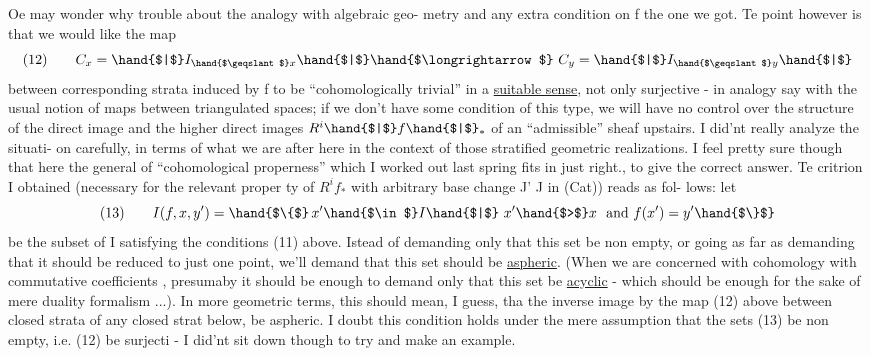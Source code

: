 Oe may wonder why trouble about the analogy with algebraic geo-%
metry and any extra condition on f  the one we got.  Te point
however is that we would like the map
\[ \text{(12)} \qquad C_x = \hand{$|$} I_{\hand{$\geqslant$}x} \hand{$|$} \hand{$\longrightarrow$} \ C_y = \hand{$|$} I_{\hand{$\geqslant$}y} \hand{$|$} \]
between corresponding strata induced by \hand{$|$}f\hand{$|$} to be ``cohomologically
trivial'' in a \uline{suitable sense},  not only surjective  -  in analogy say
with the usual notion of maps between triangulated spaces;  if we don't
have some condition of this type,  we will have no control over the
structure of the direct image and the higher direct images $R^i\hand{$|$}f\hand{$|$}_*$
of an ``admissible'' sheaf upstairs.  I did'nt really analyze the situati-%
on carefully,  in terms of what we are after here in the context of
those stratified geometric realizations.  I feel pretty sure though 
that here the general  of ``cohomological properness'' which I
worked out last spring fits in just right.,  to give the correct answer.
Te critrion I obtained (necessary for the relevant  proper%
ty of $R^if_*$  with arbitrary base change J' \hand{$\to$} J in (Cat)) reads as fol-%
lows:  let
\[ \text{(13)} \qquad I(f,x,y') = \hand{$\{$}\, x'\hand{$\in$} I \hand{$|$} \ x' \hand{$>$} x \ \text{ and } f(x') = y' \hand{$\}$} \]
be the subset of I satisfying the conditions (11) above.  Istead
of demanding only that this set be non empty,  or going as far as
demanding that it should  be reduced to just one point,  we'll
demand that this set should be \uline{aspheric}.  (When we are concerned with
cohomology with commutative coefficients ,  presumaby it should
be enough to demand only that this set be \uline{acyclic} - which should be
enough for the sake of mere duality formalism ...).  In more geometric
terms,  this should mean,  I guess,  tha the inverse image\hand{,} by the
\margin{$\times$}map (12) above between closed strata\hand{,} of any closed strat below,
\margin{\unsure{,}} be aspheric.  I doubt this condition holds under the  mere 
assumption that the sets (13) be non empty,  i.e. (12) be surjecti
-  I did'nt sit down though to try and make an example.

